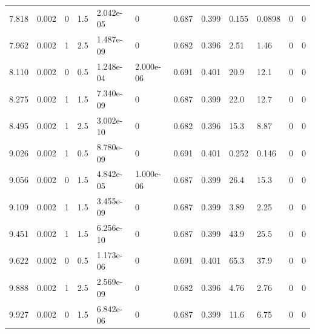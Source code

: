 \documentclass[preview]{standalone}
\begin{document}
{{\begin{tabular}{L{1.2cm}C{1.2cm} C{0.3cm}C{0.5cm} C{1.4cm}C{1.4cm} C{1.4cm}C{1.4cm} C{1.6cm}C{1.6cm} C{1.6cm}C{1.6cm}}
  7.818  &  0.002  & 0     & 1.5 &  2.042e-05  & 0  &  0.687&   0.399& 0.155 & 0.0898   &  0 & 0  \\ 
  7.962  &  0.002  & 1     & 2.5 &  1.487e-09  & 0  &  0.682&   0.396& 2.51 & 1.46   &  0 & 0  \\ 
  8.110  &  0.002  & 0     & 0.5 &  1.248e-04  & 2.000e-06  &  0.691&   0.401& 20.9 & 12.1   &  0 & 0  \\ 
  8.275  &  0.002  & 1     & 1.5 &  7.340e-09  & 0  &  0.687&   0.399& 22.0 & 12.7   &  0 & 0  \\ 
  8.495  &  0.002  & 1     & 2.5 &  3.002e-10  & 0  &  0.682&   0.396& 15.3 & 8.87   &  0 & 0  \\ 
  9.026  &  0.002  & 1     & 0.5 &  8.780e-09  & 0  &  0.691&   0.401& 0.252 & 0.146   &  0 & 0  \\ 
  9.056  &  0.002  & 0     & 1.5 &  4.842e-05  & 1.000e-06  &  0.687&   0.399& 26.4 & 15.3   &  0 & 0  \\ 
  9.109  &  0.002  & 1     & 1.5 &  3.455e-09  & 0  &  0.687&   0.399& 3.89 & 2.25   &  0 & 0  \\ 
  9.451  &  0.002  & 1     & 1.5 &  6.256e-10  & 0  &  0.687&   0.399& 43.9 & 25.5   &  0 & 0  \\ 
  9.622  &  0.002  & 0     & 0.5 &  1.173e-06  & 0  &  0.691&   0.401& 65.3 & 37.9   &  0 & 0  \\ 
  9.888  &  0.002  & 1     & 2.5 &  2.569e-09  & 0  &  0.682&   0.396& 4.76 & 2.76   &  0 & 0  \\ 
  9.927  &  0.002  & 0     & 1.5 &  6.842e-06  & 0  &  0.687&   0.399& 11.6 & 6.75   &  0 & 0  \\ 
\hline 
\end{tabular} 

}}
\end{document}
